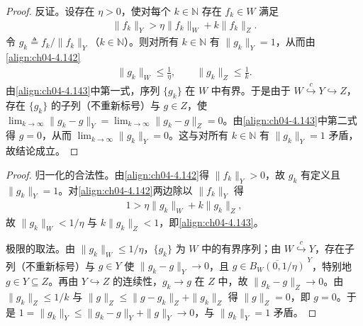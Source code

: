 \documentclass[../../main.tex]{subfiles}%
\begin{document}
\begin{proof}
反证。设存在 $\eta>0$，使对每个 $k\in\mathbb{N}$ 存在 $f_k\in W$ 满足
\begin{align}
\|f_k\|_Y>\eta\|f_k\|_W+k\|f_k\|_Z. \label{align:ch04-4.142}
\end{align}
令 $g_k\triangleq f_k/\|f_k\|_Y$（$k\in\mathbb{N}$）。则对所有 $k\in\mathbb{N}$ 有 $\|g_k\|_Y=1$，从而由\eqref{align:ch04-4.142}
\begin{align}
\|g_k\|_W\leqslant\frac1\eta,\qquad\|g_k\|_Z\leqslant\frac1k. \label{align:ch04-4.143}
\end{align}
由\eqref{align:ch04-4.143}中第一式，序列 $\{g_k\}$ 在 $W$ 中有界。于是由于 $W\overset{c}{\hookrightarrow}Y\hookrightarrow Z$，存在 $\{g_k\}$ 的子列（不重新标号）与 $g\in Z$，使 $\lim_{k\to\infty}\|g_k-g\|_Y=\lim_{k\to\infty}\|g_k-g\|_Z=0$。由\eqref{align:ch04-4.143}中第二式得 $g=0$，从而 $\lim_{k\to\infty}\|g_k\|_Y=0$。这与对所有 $k\in\mathbb{N}$ 有 $\|g_k\|_Y=1$ 矛盾，故结论成立。
\end{proof}

\begin{proof}
归一化的合法性。由\eqref{align:ch04-4.142}得 $\|f_k\|_Y>0$，故 $g_k$ 有定义且 $\|g_k\|_Y=1$。对\eqref{align:ch04-4.142}两边除以 $\|f_k\|_Y$ 得
\begin{align*}
1>\eta\|g_k\|_W+k\|g_k\|_Z ,
\end{align*}
故 $\|g_k\|_W<1/\eta$ 与 $k\|g_k\|_Z<1$，即\eqref{align:ch04-4.143}。

极限的取法。由 $\|g_k\|_W\leqslant1/\eta$，$\{g_k\}$ 为 $W$ 中的有界序列；由 $W\overset{c}{\hookrightarrow}Y$，存在子列（不重新标号）与 $g\in Y$ 使 $\|g_k-g\|_Y\to0$，且 $g\in\overline{B_W(0,1/\eta)}^{\;Y}$，特别地 $g\in Y\subseteq Z$。再由 $Y\hookrightarrow Z$ 的连续性，$g_k\to g$ 在 $Z$ 中，故 $\|g_k-g\|_Z\to0$。由 $\|g_k\|_Z\leqslant1/k$ 与 $\|g\|_Z\leqslant\|g-g_k\|_Z+\|g_k\|_Z$ 得 $\|g\|_Z=0$，即 $g=0$。于是 $1=\|g_k\|_Y\leqslant\|g_k-g\|_Y+\|g\|_Y\to0$，与 $\|g_k\|_Y=1$ 矛盾。
\end{proof}
\end{document}
